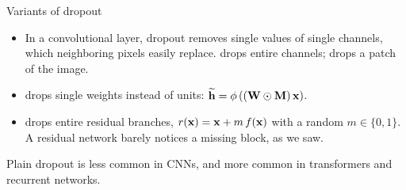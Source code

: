 \documentclass[11pt,aspectratio=169]{beamer}
\begin{document}
\begin{frame}{Variants of dropout}
    \setlength{\parskip}{5pt}

    \begin{itemize}
        \item In a convolutional layer, dropout removes single values of single
              channels, which neighboring pixels easily replace.
               drops entire channels; 
              drops a patch of the image.
        \item {} drops single weights instead of units:
              $\widetilde{\boldsymbol{\mathbf{h}}} = \phi\left((\boldsymbol{\mathbf{W}} \odot \boldsymbol{\mathbf{M}})\,\boldsymbol{\mathbf{x}}\right)$.
        \item {} drops entire residual branches,
              $r(\boldsymbol{\mathbf{x}}) = \boldsymbol{\mathbf{x}} + m\,f(\boldsymbol{\mathbf{x}})$ with a random $m \in \{0,1\}$.
              A residual network barely notices a missing block, as we saw.
    \end{itemize}

    \begin{tcolorbox}[nndsorange]
        Plain dropout is less common in CNNs, and more common in
        transformers and recurrent networks.
    \end{tcolorbox}


\end{frame}
\end{document}
